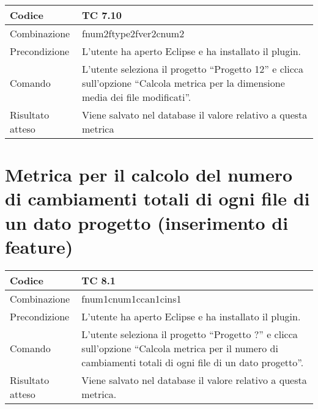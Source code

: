 \begin{table}[ht]
\begin{tabular}{|p{3cm}|p{9cm}|}
\hline
\cellcolor{lightgray}Codice				& TC 7.10								\\
\hline
\cellcolor{lightgray}Combinazione		& fnum2ftype2fver2cnum2 									\\
\hline
\cellcolor{lightgray}Precondizione		& L'utente ha aperto Eclipse e ha installato il plugin.									\\
\hline
\cellcolor{lightgray}Comando			& L'utente seleziona il progetto ``Progetto 12''  e clicca sull'opzione ``Calcola metrica per la dimensione media dei file modificati''.	\\
\hline
\cellcolor{lightgray}Risultato atteso	& Viene salvato nel database il valore relativo a questa metrica	\\
\hline
\end{tabular}
\end{table}

\clearpage

\section{Metrica per il calcolo del numero di cambiamenti totali di ogni file di un dato progetto (inserimento di feature)}

\begin{table}[ht]
\begin{tabular}{|p{3cm}|p{9cm}|}
\hline
\cellcolor{lightgray}Codice				& TC 8.1								\\
\hline
\cellcolor{lightgray}Combinazione		& fnum1cnum1ccan1cins1									\\
\hline
\cellcolor{lightgray}Precondizione		& L'utente ha aperto Eclipse e ha installato il plugin.		\\
\hline
\cellcolor{lightgray}Comando			& L'utente seleziona il progetto ``Progetto ?''  e clicca sull'opzione ``Calcola metrica per il numero di cambiamenti totali di ogni file di un dato progetto''.	\\
\hline
\cellcolor{lightgray}Risultato atteso	& Viene salvato nel database il valore relativo a questa metrica.\\
\hline
\end{tabular}
\end{table}

